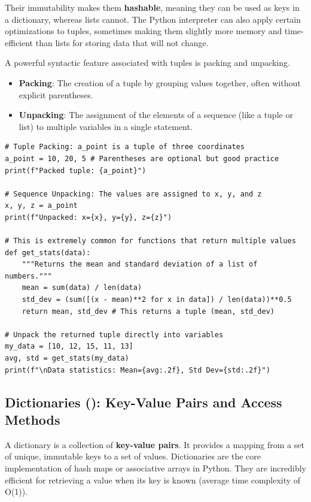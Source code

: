 Their immutability makes them \textbf{hashable}, meaning they can be used as keys in a dictionary, whereas lists cannot. The Python interpreter can also apply certain optimizations to tuples, sometimes making them slightly more memory and time-efficient than lists for storing data that will not change.

A powerful syntactic feature associated with tuples is packing and unpacking.
\begin{itemize}
    \item \textbf{Packing}: The creation of a tuple by grouping values together, often without explicit parentheses.
    \item \textbf{Unpacking}: The assignment of the elements of a sequence (like a tuple or list) to multiple variables in a single statement.
\end{itemize}

\begin{example}
\text{ }\begin{verbatim}
# Tuple Packing: a_point is a tuple of three coordinates
a_point = 10, 20, 5 # Parentheses are optional but good practice
print(f"Packed tuple: {a_point}")

# Sequence Unpacking: The values are assigned to x, y, and z
x, y, z = a_point
print(f"Unpacked: x={x}, y={y}, z={z}")

# This is extremely common for functions that return multiple values
def get_stats(data):
    """Returns the mean and standard deviation of a list of numbers."""
    mean = sum(data) / len(data)
    std_dev = (sum([(x - mean)**2 for x in data]) / len(data))**0.5
    return mean, std_dev # This returns a tuple (mean, std_dev)

# Unpack the returned tuple directly into variables
my_data = [10, 12, 15, 11, 13]
avg, std = get_stats(my_data)
print(f"\nData statistics: Mean={avg:.2f}, Std Dev={std:.2f}")
\end{verbatim}
\end{example}

\subsection{Dictionaries (): Key-Value Pairs and Access Methods}
\label{subsec:dictionaries}
A dictionary is a collection of \textbf{key-value pairs}. It provides a mapping from a set of unique, immutable keys to a set of values. Dictionaries are the core implementation of hash maps or associative arrays in Python. They are incredibly efficient for retrieving a value when its key is known (average time complexity of O(1)).


